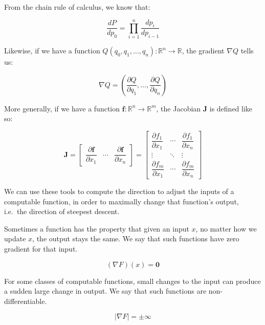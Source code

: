 \documentclass[12pt,initial,twoside,maitrise]{dms}
\numberwithin{equation}{section}
\numberwithin{table}{chapter}
\numberwithin{figure}{chapter}
\begin{document}
\noindent From the chain rule of calculus, we know that:

%
\begin{equation}
    \frac{dP}{dp_0} = {\displaystyle \prod_{i=1}^{n} \frac{dp_{i}}{dp_{i-1}}}
\end{equation}

\noindent Likewise, if we have a function $Q(q_0, q_1, \dots, q_n):  \mathbb{R}^n\rightarrow\mathbb{R}$, the gradient $\nabla Q$ tells us:

\begin{equation}
    \nabla Q = \left( \frac{\partial Q}{\partial q_1}, \dots, \frac{\partial Q}{\partial q_n}\right)
\end{equation}

\noindent More generally, if we have a function $\mathbf{f}:  \mathbb{R}^n\rightarrow\mathbb{R}^m$, the Jacobian $\mathbf J$ is defined like so:

\begin{equation}
\mathbf J = \begin{bmatrix}
                       \dfrac{\partial \mathbf{f}}{\partial x_1} & \cdots & \dfrac{\partial \mathbf{f}}{\partial x_n} \end{bmatrix}
= \begin{bmatrix}
      \dfrac{\partial f_1}{\partial x_1} & \cdots & \dfrac{\partial f_1}{\partial x_n}\\
      \vdots & \ddots & \vdots\\
      \dfrac{\partial f_m}{\partial x_1} & \cdots & \dfrac{\partial f_m}{\partial x_n} \end{bmatrix}
\end{equation}

\noindent We can use these tools to compute the direction to adjust the inputs of a computable function, in order to maximally change that function's output, i.e.\ the direction of steepest descent.

Sometimes a function has the property that given an input $x$, no matter how we update $x$, the output stays the same. We say that such functions have zero gradient for that input.

\begin{equation}
    (\nabla F)(x) = \mathbf{0}
\end{equation}

For some classes of computable functions, small changes to the input can produce a sudden large change in output. We say that such functions are non-differentiable.

\begin{equation}
    |\nabla F| = \pm \infty
\end{equation}
\end{document}
